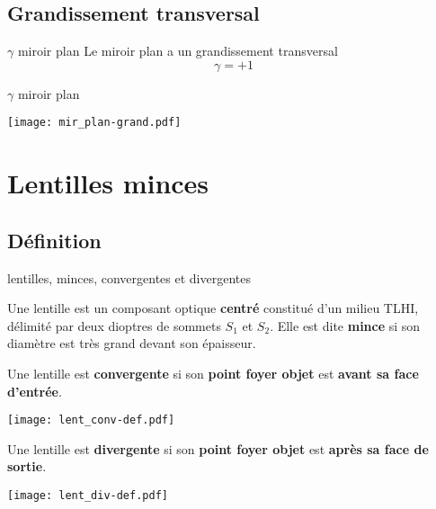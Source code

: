 \documentclass[../main/main.tex]{subfiles}
\begin{document}
\subsection{Grandissement transversal}

\begin{tcbraster}[raster columns=4, raster equal height=rows]
    \begin{prop}[label=prop:mir_grand, heart]{$\gamma$ miroir plan}
        Le miroir plan a un grandissement transversal
        \[\boxed{\gamma = +1}\]
    \end{prop}
    \begin{demo}[label=demo:mir_grand, raster multicolumn=3]{$\gamma$ miroir plan}
        \begin{center}
            \texttt{[image: mir\_plan-grand.pdf]}
            \label{fig:mir_plan-grand}
        \end{center}
    \end{demo}
\end{tcbraster}

\section{Lentilles minces}
\subsection{Définition}

\begin{defi}[label=def:lents]{{lentilles, minces, convergentes et divergentes}}

    Une lentille est un composant optique \textbf{centré} constitué d'un milieu
    TLHI, délimité par deux dioptres de sommets $S_1$ et $S_2$. Elle est dite
    \textbf{mince} si son diamètre est très grand devant son épaisseur.

    \begin{defiside}

        Une lentille est \textbf{convergente} si son \textbf{point foyer objet}
        est \textbf{avant sa face d'entrée}.
        \begin{center}
            \texttt{[image: lent\_conv-def.pdf]}
            \label{fig:lent_conv-def}
        \end{center}

        \tcblower

        Une lentille est \textbf{divergente} si son \textbf{point foyer objet}
        est \textbf{après sa face de sortie}.
        \begin{center}
            \texttt{[image: lent\_div-def.pdf]}
            \label{fig:lent_conv-def}
        \end{center}
    \end{defiside}
\end{defi}
\end{document}
